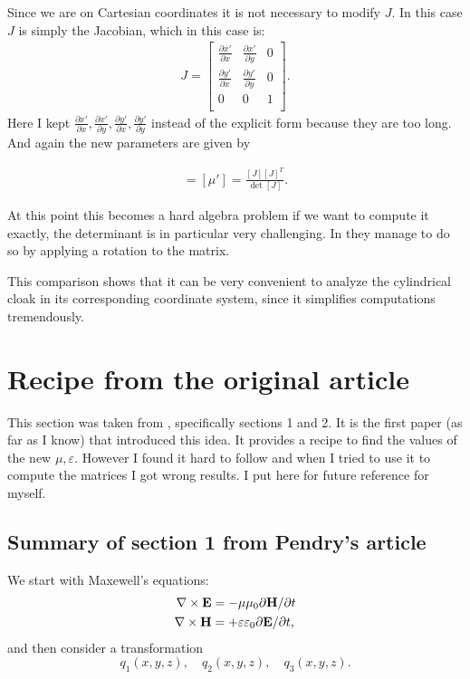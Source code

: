 \documentclass{amsart}
\begin{document}
Since we are on Cartesian coordinates it is not necessary to modify \(J\).
In this case \(J\) is simply the Jacobian, which in this case is:
\begin{align}
  J=
  \begin{bmatrix}
  \frac{\partial x'}{\partial x} & \frac{\partial x'}{\partial y} & 0 \\
  \frac{\partial y'}{\partial x} & \frac{\partial y'}{\partial y} & 0 \\
  0 & 0 & 1\\
  \end{bmatrix}.
\end{align}
Here I kept \(\frac{\partial x'}{\partial x},\frac{\partial x'}{\partial y},\frac{\partial y'}{\partial x},\frac{\partial y'}{\partial y}\) instead of the
explicit form because they are too long. And again the new parameters are given by

\begin{align*}
  [\varepsilon'] =[\mu']= \frac{[J][J]^T}{\det[J]}.
\end{align*}

At this point this becomes a hard algebra problem if we want to compute it exactly, the determinant
is in particular very challenging. In \cite{Schurig06_ray} they manage to
do so by applying a rotation to the matrix.

This comparison shows that it can be very convenient to analyze the cylindrical cloak in its
corresponding coordinate system, since it simplifies computations tremendously.


\appendix \section{Recipe from the original article}
This section was taken from \cite{ward96}, specifically sections 1 and 2.
It is the first paper (as far as I know) that introduced this idea.
It provides a recipe to find the values of the new \(\mu,\varepsilon\).
However I found it hard to follow and when I tried to use it to compute the matrices I got wrong results.
I put here for future reference for myself.

\subsection{Summary of section 1 from Pendry's article}
We start with Maxewell's equations:
\begin{align*}
  \nabla \times \textbf{E} &= -\mu \mu_0 \partial \textbf{H} /\partial t\\
  \nabla \times \textbf{H} &= +\varepsilon \varepsilon_0 \partial \textbf{E} /\partial t,
\end{align*}
and then consider a transformation
\[
q_1(x,y,z), \quad q_2(x,y,z), \quad q_3(x,y,z).
\]
\end{document}
